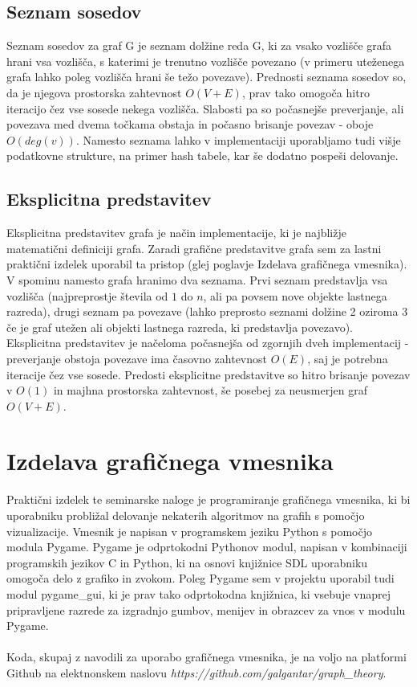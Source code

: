 \documentclass[11pt]{article}
\begin{document}
\subsection{Seznam sosedov}

Seznam sosedov za graf G je seznam dolžine reda G, ki za vsako vozlišče grafa hrani vsa vozlišča, s katerimi je trenutno vozlišče povezano (v primeru uteženega grafa lahko poleg vozlišča hrani še težo povezave). Prednosti seznama sosedov so, da je njegova prostorska zahtevnost $O(V+E)$, prav tako omogoča hitro iteracijo čez vse sosede nekega vozlišča. Slabosti pa so počasnejše preverjanje, ali povezava med dvema točkama obstaja in počasno brisanje povezav - oboje $O(deg(v))$. Namesto seznama lahko v implementaciji uporabljamo tudi višje podatkovne strukture, na primer hash tabele, kar še dodatno pospeši delovanje.

\subsection{Eksplicitna predstavitev}

Eksplicitna predstavitev grafa je način implementacije, ki je najbližje matematični definiciji grafa. Zaradi grafične predstavitve grafa sem za lastni praktični izdelek uporabil ta pristop (glej poglavje Izdelava grafičnega vmesnika). V spominu namesto grafa hranimo dva seznama. Prvi seznam predstavlja vsa vozlišča (najpreprostje števila od $1$ do $n$, ali pa povsem nove objekte lastnega razreda), drugi seznam pa povezave (lahko preprosto seznami dolžine 2 oziroma 3 če je graf utežen ali objekti lastnega razreda, ki predstavlja povezavo). Eksplicitna predstavitev je načeloma počasnejša od zgornjih dveh implementacij - preverjanje obstoja povezave ima časovno zahtevnost $O(E)$, saj je potrebna iteracije čez vse sosede. Predosti eksplicitne predstavitve so hitro brisanje povezav v $O(1)$ in majhna prostorska zahtevnost, še posebej za neusmerjen graf $O(V + E)$.


\section{Izdelava grafičnega vmesnika}

Praktični izdelek te seminarske naloge je programiranje grafičnega vmesnika, ki bi uporabniku probližal delovanje nekaterih algoritmov na grafih s pomočjo vizualizacije. Vmesnik je napisan v programskem jeziku Python s pomočjo modula Pygame. Pygame je odprtokodni Pythonov modul, napisan v kombinaciji programskih jezikov C in Python, ki na osnovi knjižnice SDL uporabniku omogoča delo z grafiko in zvokom. Poleg Pygame sem v projektu uporabil tudi modul pygame\_gui, ki je prav tako odprtokodna knjižnica, ki vsebuje vnaprej pripravljene razrede za izgradnjo gumbov, menijev in obrazcev za vnos v modulu Pygame. \cite{Pygame, PyGui}
\\ \\
Koda, skupaj z navodili za uporabo grafičnega vmesnika, je na voljo na platformi Github na elektnonskem naslovu \textit{https://github.com/galgantar/graph\_theory}.
\end{document}

